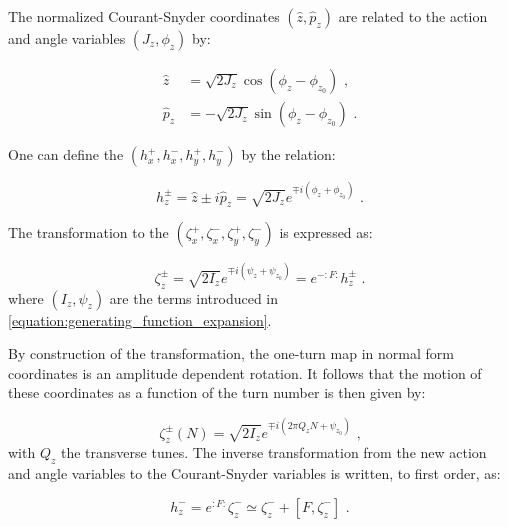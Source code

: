 The normalized Courant-Snyder coordinates \(\left( \hat{z}, \hat{p}_z \right)\) are related to the action and angle variables \(\left( J_z, \phi_z \right)\) by:

\begin{equation}
    \begin{aligned}
        \hat{z}   &= \sqrt{2 J_z} \cos \left( \phi_z - \phi_{z_0} \right) \text{ ,} \\
        \hat{p}_z &= - \sqrt{2 J_z} \sin \left( \phi_z - \phi_{z_0} \right) \text{ .}
    \end{aligned}
    \label{equation:normalized_courant_snyder_coordinates_from_action_angle}
\end{equation}

One can define the  \(\left( h_x^{+}, h_x^{-}, h_y^{+}, h_y^{-} \right)\) by the relation:

\begin{equation}
    h_z^{\pm} = \hat{z} \pm i \hat{p}_z = \sqrt{2 J_z} e^{\mp i \left( \phi_z + \phi_{z_0} \right)} \text{ .}
    \label{equation:resonance_basis_definition}
\end{equation}

The transformation to the  \(\left( \zeta_x^{+}, \zeta_x^{-}, \zeta_y^{+}, \zeta_y^{-} \right)\) is expressed as:

\begin{equation}
    \zeta_z^{\pm} = \sqrt{2 I_z} e^{\mp i \left( \psi_z + \psi_{z_0} \right)} = e^{-:F:} h_z^{\pm} \text{ .}
    \label{equation:transformation_to_normal_form_coordinates_from_h_pm}
\end{equation}
where \((I_z, \psi_z)\) are the terms introduced in \cref{equation:generating_function_expansion}.

By construction of the transformation, the one-turn map in normal form coordinates is an amplitude dependent rotation.
It follows that the motion of these coordinates as a function of the turn number is then given by:

\begin{equation}
    \zeta_z^{\pm}(N) = \sqrt{2 I_z} e^{\mp i \left( 2 \pi Q_z N + \psi_{z_0} \right)} \text{ ,}
    \label{equation:normal_form_N_turn_expression}
\end{equation}
with \(Q_z\) the transverse tunes.
The inverse transformation from the new action and angle variables to the Courant-Snyder variables is written, to first order, as:

\begin{equation}
    h_z^{-} = e^{:F:} \zeta_z^{-} \simeq \zeta_z^{-} + \left[ F, \zeta_z^{-} \right] \text{ .}
    \label{equation:inverse_transformation_normal_form_to_courant_snyder_coordinates}
\end{equation}

